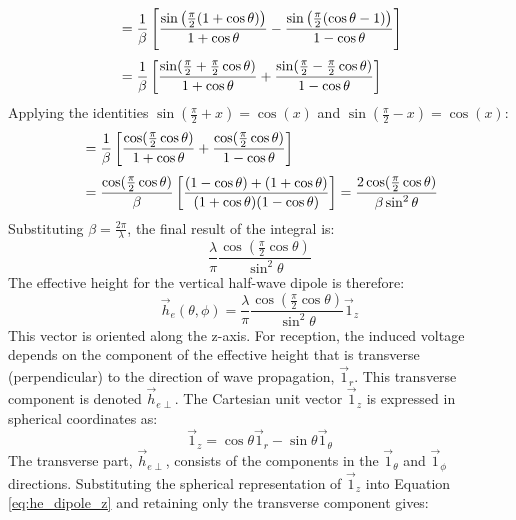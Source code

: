 \begin{align}
	&= \frac{1}{\beta} \left[ \frac{\sin\left(\frac{\pi}{2}(1+\cos\theta)\right)}{1+\cos\theta} - \frac{\sin\left(\frac{\pi}{2}(\cos\theta-1)\right)}{1-\cos\theta} \right] \\[\jot]
	&= \frac{1}{\beta} \left[ \frac{\sin(\frac{\pi}{2}+\frac{\pi}{2}\cos\theta)}{1+\cos\theta} + \frac{\sin(\frac{\pi}{2}-\frac{\pi}{2}\cos\theta)}{1-\cos\theta} \right]
\end{align}
\vspace{1em}
Applying the identities $\sin(\frac{\pi}{2}+x) = \cos(x)$ and $\sin(\frac{\pi}{2}-x) = \cos(x)$:
\vspace{1em}
\begin{align}
	&= \frac{1}{\beta} \left[ \frac{\cos(\frac{\pi}{2}\cos\theta)}{1+\cos\theta} + \frac{\cos(\frac{\pi}{2}\cos\theta)}{1-\cos\theta} \right] \\[\jot]
	&= \frac{\cos(\frac{\pi}{2}\cos\theta)}{\beta} \left[ \frac{(1-\cos\theta) + (1+\cos\theta)}{(1+\cos\theta)(1-\cos\theta)} \right] = \frac{2\cos(\frac{\pi}{2}\cos\theta)}{\beta\sin^2\theta}
\end{align}
\vspace{1em}
Substituting $\beta=\frac{2\pi}{\lambda}$, the final result of the integral is:
\begin{equation}
	\frac{\lambda}{\pi} \frac{\cos(\frac{\pi}{2}\cos\theta)}{\sin^2\theta}
\end{equation}
\vspace{0.5em}
The effective height for the vertical half-wave dipole is therefore:
\begin{equation}
	\vec{h}_e(\theta, \phi) = \frac{\lambda}{\pi} \frac{\cos(\frac{\pi}{2}\cos\theta)}{\sin^2\theta} \vec{1}_z
	\label{eq:he_dipole_z}
\end{equation}
\vspace{0.5em}
This vector is oriented along the z-axis. For reception, the induced voltage depends on the component of the effective height that is transverse (perpendicular) to the direction of wave propagation, $\vec{1}_r$. This transverse component is denoted $\vec{h}_{e\perp}$. The Cartesian unit vector $\vec{1}_z$ is expressed in spherical coordinates as:
\begin{equation}
	\vec{1}_z = \cos\theta \vec{1}_r - \sin\theta \vec{1}_\theta
\end{equation}
\vspace{0.5em}
The transverse part, $\vec{h}_{e\perp}$, consists of the components in the $\vec{1}_\theta$ and $\vec{1}_\phi$ directions. Substituting the spherical representation of $\vec{1}_z$ into Equation \ref{eq:he_dipole_z} and retaining only the transverse component gives:

